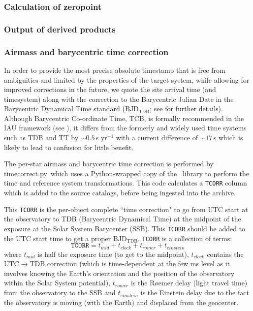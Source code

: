 \documentclass[twoside,11pt]{article}
\newcommand{\xref}[3]{#1}
\renewcommand{\_}{\texttt{\symbol{95}}}
\newcommand{\SLALIB}{\xref{{\sc{SLALIB}}}{sun67}{}}
\newcommand{\task}[1]{\textsf{#1}}
\newcommand{\ndfcomp}[1]{\texttt{#1}}    %
\newcommand{\rmn}[1] {\mathrm{#1}}
\begin{document}
\subsubsection{Calculation of zeropoint}
\subsubsection{Output of derived products}
\subsubsection{Airmass and barycentric time correction}


In order to provide the most precise absolute timestamp that is free from
ambiguities and limited by the properties of the target system, while allowing
for improved corrections in the future, we quote the site arrival time (and
timesystem) along with the correction to the Barycentric Julian Date in the
Barycentric Dynamical Time standard (BJD$_\rmn{TDB}$; see \cite{eastman2010} for
further details). Although Barycentric Co-ordinate Time, TCB, is formally
recommended in the IAU framework (see \cite{iers2010}), it differs from the
formerly and widely used time systems such as TDB and TT by
$\sim0.5$\,s yr$^{-1}$ with a current difference of $\sim17$\,s which is likely to
lead to confusion for little benefit.

The per-star airmass and barycentric time correction is performed by
\task{timecorrect.py}\ which uses a Python-wrapped copy of the \SLALIB\ library
to perform the time and reference system transformations. This code calculates a
\ndfcomp{TCORR} column which is added to the source catalogs, before being
ingested into the archive. 

This \ndfcomp{TCORR} is the per-object complete ``time correction" to go from UTC start at the
observatory to TDB (Barycentric Dynamical Time) at the midpoint of the exposure
at the Solar System Barycenter (SSB). This \ndfcomp{TCORR} should be added to the UTC
start time to get a proper BJD$_\rmn{TDB}$. \ndfcomp{TCORR} is a collection of terms:
\begin{equation}
\texttt{TCORR} = t_{mid}+t_{clock}+t_{romer}+t_{einstein}
\end{equation}
where $t_{mid}$ is half the exposure time (to get to the midpoint), $t_{clock}$
contains the $\rmn{UTC}\rightarrow\rmn{TDB}$ correction (which is time-dependent at the few ms level as
it involves knowing the Earth's orientation and the position of the observatory
within the Solar System potential), $t_{romer}$ is the R\o emer delay (light travel
time) from the observatory to the SSB and $t_{einstein}$ is the Einstein delay due
to the fact the observatory is moving (with the Earth) and displaced from the geocenter.
\end{document}
